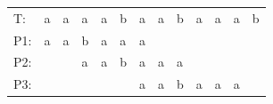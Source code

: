 \begin{table}[h]
\centering
\label{my-label7}
\begin{tabular}{lllllllllllll}
\cline{2-13}
\multicolumn{1}{l|}{T:}  & \multicolumn{1}{l|}{a}                         & \multicolumn{1}{l|}{a}                         & \multicolumn{1}{l|}{a}                         & \multicolumn{1}{l|}{a}                         & \multicolumn{1}{l|}{b}                         & \multicolumn{1}{l|}{a}                         & \multicolumn{1}{l|}{a}                         & \multicolumn{1}{l|}{b}                         & \multicolumn{1}{l|}{a}                         & \multicolumn{1}{l|}{a}                         & \multicolumn{1}{l|}{a}                         & \multicolumn{1}{l|}{b} \\ \cline{2-13} 
\multicolumn{1}{l|}{P1:} & \multicolumn{1}{l|}{\cellcolor[HTML]{FFFFFF}a} & \multicolumn{1}{l|}{\cellcolor[HTML]{FFFFFF}a} & \multicolumn{1}{l|}{\cellcolor[HTML]{FFFFFF}b} & \multicolumn{1}{l|}{\cellcolor[HTML]{FFFFFF}a} & \multicolumn{1}{l|}{\cellcolor[HTML]{FD6864}a} & \multicolumn{1}{l|}{\cellcolor[HTML]{9AFF99}a} & \cellcolor[HTML]{FFFFFF}                       & \cellcolor[HTML]{FFFFFF}                       & \cellcolor[HTML]{FFFFFF}                       & \cellcolor[HTML]{FFFFFF}                       & \cellcolor[HTML]{FFFFFF}                       &                        \\ \cline{2-9}
P2:                      & \cellcolor[HTML]{FFFFFF}                       & \multicolumn{1}{l|}{\cellcolor[HTML]{FFFFFF}}  & \multicolumn{1}{l|}{\cellcolor[HTML]{FFFFFF}a} & \multicolumn{1}{l|}{\cellcolor[HTML]{FFFFFF}a} & \multicolumn{1}{l|}{\cellcolor[HTML]{FFFFFF}b} & \multicolumn{1}{l|}{\cellcolor[HTML]{FFFFFF}a} & \multicolumn{1}{l|}{\cellcolor[HTML]{FFFFFF}a} & \multicolumn{1}{l|}{\cellcolor[HTML]{FD6864}a} & \cellcolor[HTML]{FFFFFF}                       & \cellcolor[HTML]{FFFFFF}                       & \cellcolor[HTML]{FFFFFF}                       &                        \\ \cline{4-12}
P3:                      & \cellcolor[HTML]{FFFFFF}                       & \cellcolor[HTML]{FFFFFF}                       & \cellcolor[HTML]{FFFFFF}                       & \cellcolor[HTML]{FFFFFF}                       & \multicolumn{1}{l|}{\cellcolor[HTML]{FFFFFF}}  & \multicolumn{1}{l|}{\cellcolor[HTML]{9AFF99}a} & \multicolumn{1}{l|}{\cellcolor[HTML]{9AFF99}a} & \multicolumn{1}{l|}{\cellcolor[HTML]{9AFF99}b} & \multicolumn{1}{l|}{\cellcolor[HTML]{9AFF99}a} & \multicolumn{1}{l|}{\cellcolor[HTML]{9AFF99}a} & \multicolumn{1}{l|}{\cellcolor[HTML]{9AFF99}a} &                        \\ \cline{7-12}

\end{tabular}
\end{table}
